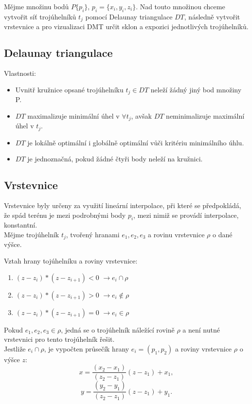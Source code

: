 \documentclass[a4paper, 12pt]{article}
\begin{document}
Mějme množinu bodů $P \{p_i\}$,  $p_i = \{x_i, y_i, z_i\}$. Nad touto množinou chceme vytvořit síť trojúhelníků $t_j$ pomocí Delaunay triangulace $DT$, následně vytvořit vrstevnice a pro vizualizaci DMT určit sklon a expozici jednotlivých trojúhelníků.\\ 

\subsection{Delaunay triangulace}
Vlastnosti:
\begin{itemize}
\item Uvnitř kružnice opsané trojúhelníku $t_j \in DT$ neleží žádný jiný bod množiny P.
\item $DT$ maximalizuje minimální úhel v $\forall t_j$, avšak $DT$ neminimalizuje maximální úhel v $t_j$.
\item $DT$ je lokálně optimální i globálně optimální vůči kritériu minimálního úhlu.
\item $DT$ je jednoznačná, pokud žádné čtyři body neleží na kružnici.
\end{itemize}
\vspace{1.5cm}

\subsection{Vrstevnice}
Vrstevnice byly určeny za využití lineární interpolace, při které se předpokládá, že spád terénu je mezi podrobnými body $p_i$, mezi nimiž se provádí interpolace, konstantní.\\

Mějme trojúhelník $t_j$, tvořený hranami $e_1, e_2, e_3$ a rovinu vrstevnice $\rho$ o dané výšce.

Vztah hrany tojúhelníku a roviny vrstevnice:
\begin{enumerate}
\item $(z-z_i)*(z-z_{i+1}) < 0$  $\longrightarrow e_i \cap \rho$
\item $(z-z_i)*(z-z_{i+1}) > 0$  $\longrightarrow e_i \notin \rho$ 
\item $(z-z_i)*(z-z_{i+1}) = 0$  $\longrightarrow e_i \in \rho$
\end{enumerate}

\noindent Pokud  $e_1, e_2, e_3 \in \rho$, jedná se o trojúhelník náležící rovině $\rho$ a není nutné vrstevnici pro tento trojúhelník řešit.\\
Jestliže $e_i \cap \rho$, je vypočten průsečík hrany $e_i = (p_1, p_2)$ a roviny vrstevnice $\rho$ o výšce $z$:
$$ x = \frac{(x_2-x_1)}{(z_2-z_1)}(z-z_1)+x_1, $$
$$ y = \frac{(y_2-y_1)}{(z_2-z_1)}(z-z_1)+y_1.$$
\clearpage
\end{document}
